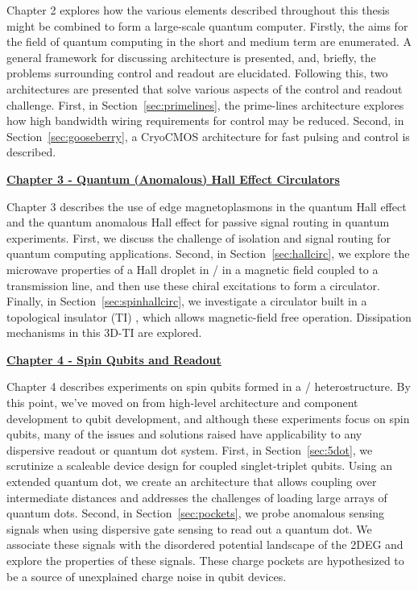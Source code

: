 \noindent
Chapter 2 explores how the various elements described throughout this thesis might be combined to form
a large-scale quantum computer. Firstly, the aims for the field of quantum computing in the short and medium term are
enumerated. A general framework for discussing architecture is presented, and, briefly, the problems surrounding control
and readout are elucidated. Following this, two architectures are presented that solve various aspects of the control
and readout challenge. First, in Section~\ref{sec:primelines}, the prime-lines architecture explores how high bandwidth
wiring requirements for control may be reduced. Second, in Section~\ref{sec:gooseberry}, a CryoCMOS architecture for fast
pulsing and control is described.

\medskip
\noindent\textbf{\hyperref[sec:hall]{Chapter 3 - Quantum (Anomalous) Hall Effect Circulators}}

\noindent
Chapter 3 describes the use of edge magnetoplasmons in the quantum Hall effect and the quantum anomalous Hall effect
for passive signal routing in quantum experiments. First, we discuss the challenge of isolation and signal routing
for quantum computing applications. Second, in Section~\ref{sec:hallcirc}, we explore the microwave properties of a
Hall droplet in / in a magnetic field coupled to a transmission line, and then use these chiral
excitations to form a circulator. Finally, in Section~\ref{sec:spinhallcirc}, we investigate a circulator built in a topological
insulator (TI) , which allows magnetic-field free operation. Dissipation mechanisms in this 3D-TI
are explored.

\medskip
\noindent\textbf{\hyperref[sec:spinqubit]{Chapter 4 - Spin Qubits and Readout}}

\noindent
Chapter 4 describes experiments on spin qubits formed in a / heterostructure. By this point, we've moved
on from high-level architecture and component development to qubit development, and although these experiments focus on
spin qubits, many of the issues and solutions raised have applicability to any dispersive readout or quantum dot system.
First, in Section~\ref{sec:5dot}, we scrutinize a scaleable device design for coupled singlet-triplet qubits. Using an
extended quantum dot, we create an architecture that allows coupling over intermediate distances and addresses the challenges
of loading large arrays of quantum dots. Second, in Section~\ref{sec:pockets}, we probe anomalous sensing signals when
using dispersive gate sensing to read out a quantum dot. We associate these signals with the disordered potential landscape
of the 2DEG and explore the properties of these signals. These charge pockets are hypothesized to be a source of unexplained
charge noise in qubit devices.

